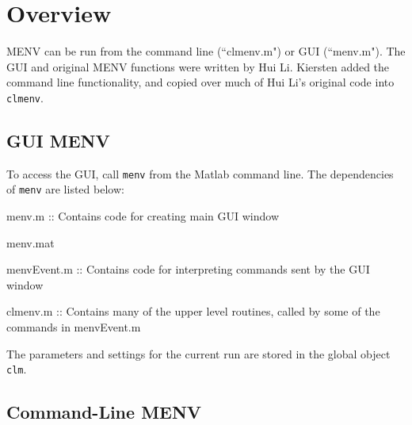 \documentclass[../menv_main.tex]{subfiles}
\begin{document}
\section{Overview}

MENV can be run from the command line (``clmenv.m") or GUI (``menv.m"). The GUI and original MENV functions were written by Hui Li. Kiersten added the command line functionality, and copied over much of Hui Li's original code into \verb|clmenv|. 

\subsection{GUI MENV}

To access the GUI, call \verb|menv| from the Matlab command line. The dependencies of \verb|menv| are listed below:

\begin{itemized}
\item menv.m :: Contains code for creating main GUI window
\item menv.mat
\item menvEvent.m :: Contains code for interpreting commands sent by the GUI window
\item clmenv.m :: Contains many of the upper level routines, called by some of the commands in menvEvent.m
\end{itemized}

The parameters and settings for the current run are stored in the global object \verb|clm|.


\subsection{Command-Line MENV}
\end{document}
